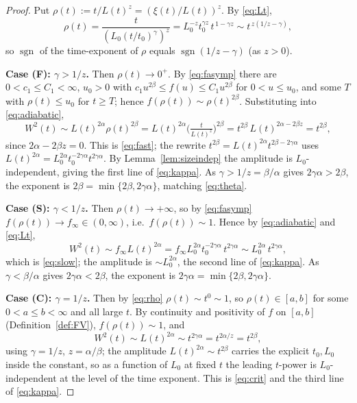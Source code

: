 \documentclass{amsart}
\theoremstyle{definition}
\newcommand{\asymp}{\sim}
\begin{document}
\begin{proof}
Put $\rho(t):=t/L(t)^{z}=(\xi(t)/L(t))^{z}$. By \eqref{eq:Lt},
\begin{equation}\label{eq:rho}
  \rho(t)=\frac{t}{(L_0 (t/t_0)^{\gamma})^{z}}
  =L_0^{-z}t_0^{\gamma z}\,t^{\,1-\gamma z}
  \asymp t^{\,z(1/z-\gamma)} ,
\end{equation}
so $\operatorname{sgn}$ of the time-exponent of $\rho$ equals
$\operatorname{sgn}(1/z-\gamma)$ (as $z>0$).

\medskip\noindent\textbf{Case (F): $\gamma>1/z$.} Then $\rho(t)\to0^+$. By
\eqref{eq:fasymp} there are $0<c_1\le C_1<\infty$, $u_0>0$ with
$c_1u^{2\beta}\le f(u)\le C_1u^{2\beta}$ for $0<u\le u_0$, and some $T$ with
$\rho(t)\le u_0$ for $t\ge T$; hence $f(\rho(t))\asymp\rho(t)^{2\beta}$.
Substituting into \eqref{eq:adiabatic},
\[
  W^2(t)\asymp L(t)^{2\alpha}\rho(t)^{2\beta}
  =L(t)^{2\alpha}\Big(\tfrac{t}{L(t)^{z}}\Big)^{2\beta}
  =t^{2\beta}\,L(t)^{2\alpha-2\beta z}=t^{2\beta},
\]
since $2\alpha-2\beta z=0$. This is \eqref{eq:fast}; the rewrite
$t^{2\beta}=L(t)^{2\alpha}t^{2\beta-2\gamma\alpha}$ uses
$L(t)^{2\alpha}=L_0^{2\alpha}t_0^{-2\gamma\alpha}t^{2\gamma\alpha}$. By
Lemma~\ref{lem:sizeindep} the amplitude is $L_0$-independent, giving the first line
of \eqref{eq:kappa}. As $\gamma>1/z=\beta/\alpha$ gives $2\gamma\alpha>2\beta$, the
exponent is $2\beta=\min\{2\beta,2\gamma\alpha\}$, matching \eqref{eq:theta}.

\medskip\noindent\textbf{Case (S): $\gamma<1/z$.} Then $\rho(t)\to+\infty$, so by
\eqref{eq:fasymp} $f(\rho(t))\to f_\infty\in(0,\infty)$, i.e.\ $f(\rho(t))\asymp1$.
Hence by \eqref{eq:adiabatic} and \eqref{eq:Lt},
\[
  W^2(t)\asymp f_\infty L(t)^{2\alpha}
  =f_\infty L_0^{2\alpha}t_0^{-2\gamma\alpha}\,t^{2\gamma\alpha}
  \asymp L_0^{2\alpha}\,t^{2\gamma\alpha},
\]
which is \eqref{eq:slow}; the amplitude is $\asymp L_0^{2\alpha}$, the second line
of \eqref{eq:kappa}. As $\gamma<\beta/\alpha$ gives $2\gamma\alpha<2\beta$, the
exponent is $2\gamma\alpha=\min\{2\beta,2\gamma\alpha\}$.

\medskip\noindent\textbf{Case (C): $\gamma=1/z$.} Then by \eqref{eq:rho}
$\rho(t)\asymp t^{0}\asymp1$, so $\rho(t)\in[a,b]$ for some $0<a\le b<\infty$ and
all large $t$. By continuity and positivity of $f$ on $[a,b]$
(Definition~\ref{def:FV}), $f(\rho(t))\asymp1$, and
\[
  W^2(t)\asymp L(t)^{2\alpha}\asymp t^{2\gamma\alpha}=t^{2\alpha/z}=t^{2\beta},
\]
using $\gamma=1/z$, $z=\alpha/\beta$; the amplitude $L(t)^{2\alpha}\asymp t^{2\beta}$
carries the explicit $t_0,L_0$ inside the constant, so as a function of $L_0$ at
fixed $t$ the leading $t$-power is $L_0$-independent at the level of the time
exponent. This is \eqref{eq:crit} and the third line of \eqref{eq:kappa}.


\end{proof}
\end{document}
